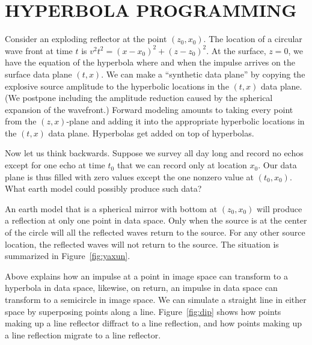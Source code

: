 \section{HYPERBOLA PROGRAMMING}
Consider an exploding reflector at the point $(z_0,x_0)$.
The location of a circular wave front at time $t$ is
$v^2t^2= (x-x_0)^2 + (z-z_0)^2$.
At the surface, $z=0$, we have the equation of the hyperbola
where and when the impulse arrives on the surface data plane $(t,x)$.
We can make a ``synthetic data plane'' by copying the explosive
source amplitude to the hyperbolic locations in the $(t,x)$ data plane.
(We postpone including the amplitude reduction caused
by the spherical expansion of the wavefront.)
Forward modeling amounts to taking every point from the $(z,x)$-plane
and adding it into the appropriate hyperbolic locations in 
the $(t,x)$ data plane.  Hyperbolas get added on top of hyperbolas.
\par
Now let us think backwards.
Suppose we survey all day long and record no echos except for
one echo at time $t_0$ that we can record only at location $x_0$.
Our data plane is thus filled with zero values except the one
nonzero value at $(t_0,x_0)$.
What earth model could possibly produce such data?
\par
An earth model that is a spherical mirror with bottom at
$(z_0,x_0)$ will produce a reflection at only one point
in data space.  Only when the source is at the center
of the circle will all the reflected waves return to the source.
For any other source location, the reflected waves will
not return to the source.
The situation is summarized in Figure~\ref{fig:yaxun}.

\par
Above explains how an impulse at a point in image space
can transform to a hyperbola in data space,
likewise, on return, an impulse in data space can transform
to a semicircle in image space.
We can simulate a straight line in either space
by superposing points along a line.
Figure~\ref{fig:dip} shows
how points making up a line reflector diffract to a line reflection, and
how points making up a line reflection migrate to a line reflector.

